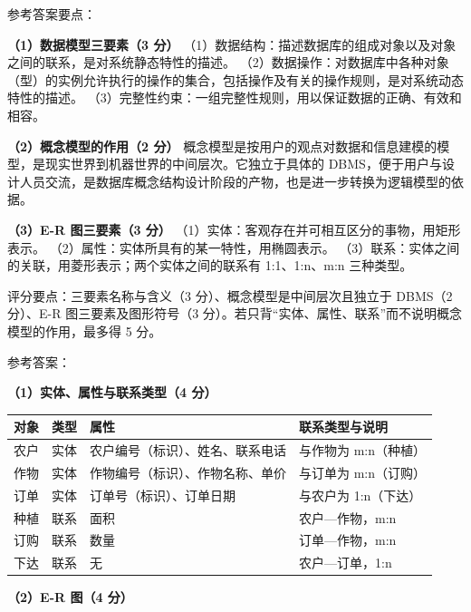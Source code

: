\documentclass[a4paper,11pt]{article}
\begin{document}
\q 参考答案要点：

\textbf{（1）数据模型三要素（3 分）}
（1）数据结构：描述数据库的组成对象以及对象之间的联系，是对系统静态特性的描述。
（2）数据操作：对数据库中各种对象（型）的实例允许执行的操作的集合，包括操作及有关的操作规则，是对系统动态特性的描述。
（3）完整性约束：一组完整性规则，用以保证数据的正确、有效和相容。

\textbf{（2）概念模型的作用（2 分）}
概念模型是按用户的观点对数据和信息建模的模型，是现实世界到机器世界的中间层次。它独立于具体的 DBMS，便于用户与设计人员交流，是数据库概念结构设计阶段的产物，也是进一步转换为逻辑模型的依据。

\textbf{（3）E-R 图三要素（3 分）}
（1）实体：客观存在并可相互区分的事物，用矩形表示。
（2）属性：实体所具有的某一特性，用椭圆表示。
（3）联系：实体之间的关联，用菱形表示；两个实体之间的联系有 1:1、1:n、m:n 三种类型。
\begin{analysis}评分要点：三要素名称与含义（3 分）、概念模型是中间层次且独立于 DBMS（2 分）、E-R 图三要素及图形符号（3 分）。若只背“实体、属性、联系”而不说明概念模型的作用，最多得 5 分。\end{analysis}


\q 参考答案：

\textbf{（1）实体、属性与联系类型（4 分）}
\begin{center}
\begin{tabular}{@{}llll@{}}
\toprule
对象 & 类型 & 属性 & 联系类型与说明 \\
\midrule
农户 & 实体 & 农户编号（标识）、姓名、联系电话 & 与作物为 m:n（种植） \\
作物 & 实体 & 作物编号（标识）、作物名称、单价 & 与订单为 m:n（订购） \\
订单 & 实体 & 订单号（标识）、订单日期 & 与农户为 1:n（下达） \\
种植 & 联系 & 面积 & 农户—作物，m:n \\
订购 & 联系 & 数量 & 订单—作物，m:n \\
下达 & 联系 & 无 & 农户—订单，1:n \\
\bottomrule
\end{tabular}
\end{center}

\textbf{（2）E-R 图（4 分）}
\end{document}

